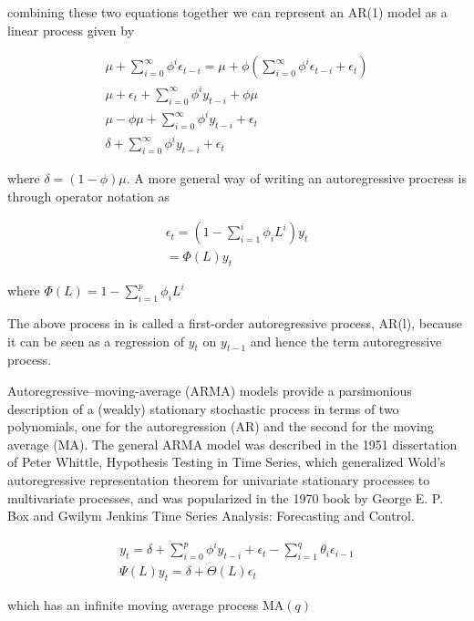 \documentclass[
  11pt,
]{article}
\begin{document}
combining these two equations together we can represent an AR(1) model
as a linear process given by

\begin{gather*}
\mu + \sum\limits_{i=0}^{\infty}\phi^{i}\epsilon_{t-i} = \mu + \phi\left(\sum\limits_{i=0}^{\infty}\phi^{i}\epsilon_{t-i} + \epsilon_{t}\right) \\[8pt]
\mu + \epsilon_{t} + \sum\limits_{i=0}^{\infty}\phi^{i}y_{t-i} + \phi\mu \\[8pt]
\mu - \phi\mu + \sum\limits_{i=0}^{\infty}\phi^{i}y_{t-i} + \epsilon_{t} \\[8pt]
\delta + \sum\limits_{i=0}^{\infty}\phi^{i}y_{t- i} + \epsilon_{t}
\end{gather*}

where \(\delta = (1 - \phi)\mu\). A more general way of writing an
autoregressive procress is through operator notation as

\begin{gather*}
\epsilon_{t} = \left(1 - \sum\limits_{i=1}^{i}\phi_{i}L^{i} \right)y_{t} \\[8pt]
 = \Phi(L)y_{t}
\end{gather*}

where \(\Phi(L) = 1 - \sum\limits_{i=1}^{p}\phi_{i}L^{i}\)

The above process in is called a first-order autoregressive process,
AR(l), because it can be seen as a regression of \(y_{t}\) on
\(y_{t-1}\) and hence the term autoregressive process.

Autoregressive--moving-average (ARMA) models provide a parsimonious
description of a (weakly) stationary stochastic process in terms of two
polynomials, one for the autoregression (AR) and the second for the
moving average (MA). The general ARMA model was described in the 1951
dissertation of Peter Whittle, Hypothesis Testing in Time Series, which
generalized Wold's autoregressive representation theorem for univariate
stationary processes to multivariate processes, and was popularized in
the 1970 book by George E. P. Box and Gwilym Jenkins Time Series
Analysis: Forecasting and Control.

\begin{gather*}
y_{t} = \delta + \sum\limits_{i=0}^{p}\phi^{i}y_{t- i} + \epsilon_{t} - \sum\limits_{i=1}^{q}\theta_{i}\epsilon_{i-1} \\[8pt]
\Psi(L)y_{t} = \delta + \Theta(L)\epsilon_{t} 
\end{gather*}

which has an infinite moving average process \(\mathrm{MA}(q)\)
\end{document}
